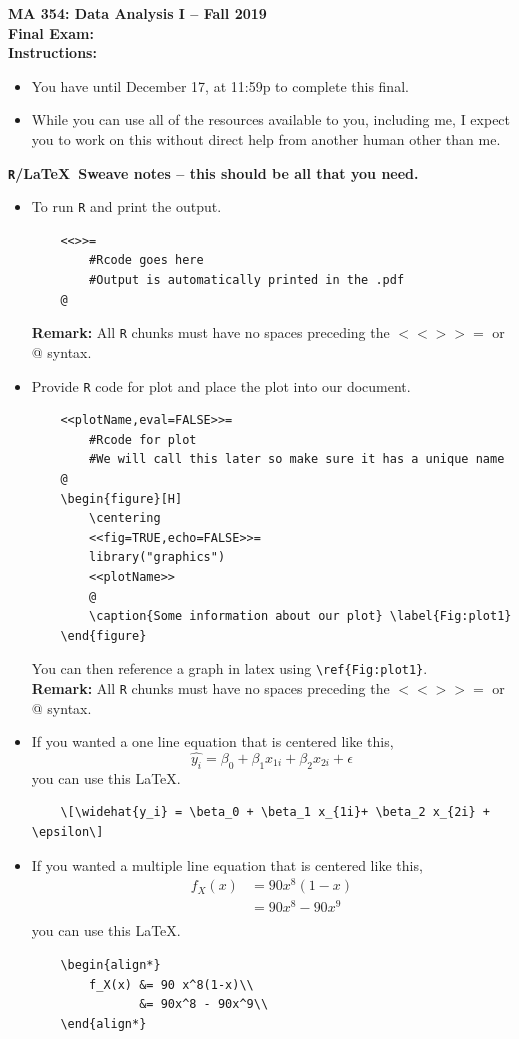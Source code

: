 \documentclass{article}
\begin{document}

\noindent \textbf{MA 354: Data Analysis I -- Fall 2019}\\%
\noindent \textbf{Final Exam:}\vspace{1em}\\
\textbf{Instructions:}
\begin{itemize}
	\item You have until December 17, at 11:59p to complete this final.
	\item While you can use all of the resources available to you,
	including me, I expect you to work on this without direct help from another
	human other than me.
\end{itemize}
\small
\textbf{\texttt{R}/\LaTeX ~Sweave notes -- this should be all that you need.}
	\begin{itemize}
		\item To run \texttt{R} and print the output.
	\begin{Verbatim}
	<<>>=
		#Rcode goes here
		#Output is automatically printed in the .pdf
	@
	\end{Verbatim}
		\textbf{Remark:} All \texttt{R} chunks must have no spaces preceding the $<<>>=$ or @ syntax. 
	
		\item Provide \texttt{R} code for plot and place the plot into our document.
	\begin{Verbatim}
	<<plotName,eval=FALSE>>=
		#Rcode for plot
		#We will call this later so make sure it has a unique name
	@
	\begin{figure}[H]
		\centering
		<<fig=TRUE,echo=FALSE>>=
		library("graphics")
		<<plotName>>
		@
		\caption{Some information about our plot} \label{Fig:plot1}
	\end{figure}
	\end{Verbatim}
	You can then reference a graph in latex using \verb|\ref{Fig:plot1}|.\\
	\textbf{Remark:} All \texttt{R} chunks must have no spaces preceding the $<<>>=$ or @ syntax. 
	\item If you wanted a one line equation that is centered like this,
	\[\widehat{y_i} = \beta_0 + \beta_1 x_{1i}+ \beta_2 x_{2i} + \epsilon\]
	you can use this \LaTeX.
	\begin{Verbatim}
	\[\widehat{y_i} = \beta_0 + \beta_1 x_{1i}+ \beta_2 x_{2i} + \epsilon\]
	\end{Verbatim}
	\item If you wanted a multiple line equation that is centered like this,
	\begin{align*}
		f_X(x) &= 90 x^8(1-x)\\
		       &= 90x^8 - 90x^9\\
	\end{align*}
	you can use this \LaTeX.
	\begin{Verbatim}
	\begin{align*}
		f_X(x) &= 90 x^8(1-x)\\
			   &= 90x^8 - 90x^9\\
	\end{align*}
	\end{Verbatim}
	\end{itemize}
\end{document}

